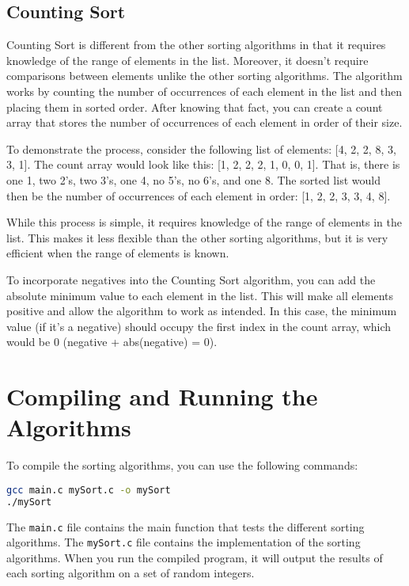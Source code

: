 \documentclass[12pt]{article}
\begin{document}
\subsection{Counting Sort}

Counting Sort is different from the other sorting algorithms in that it requires knowledge of the range of elements in the list.
Moreover, it doesn't require comparisons between elements unlike the other sorting algorithms.
The algorithm works by counting the number of occurrences of each element in the list and then placing them in sorted order.
After knowing that fact, you can create a count array that stores the number of occurrences of each element in order of their size.

To demonstrate the process, consider the following list of elements: [4, 2, 2, 8, 3, 3, 1].
The count array would look like this: [1, 2, 2, 2, 1, 0, 0, 1].
That is, there is one 1, two 2's, two 3's, one 4, no 5's, no 6's, and one 8.
The sorted list would then be the number of occurrences of each element in order: [1, 2, 2, 3, 3, 4, 8].

While this process is simple, it requires knowledge of the range of elements in the list.
This makes it less flexible than the other sorting algorithms, but it is very efficient when the range of elements is known.

To incorporate negatives into the Counting Sort algorithm, you can add the absolute minimum value to each element in the list.
This will make all elements positive and allow the algorithm to work as intended.
In this case, the minimum value (if it's a negative) should occupy the first index in the count array, which would be 0 (negative + abs(negative) = 0).

\section{Compiling and Running the Algorithms}

To compile the sorting algorithms, you can use the following commands:


\begin{lstlisting}[language=bash]
gcc main.c mySort.c -o mySort
./mySort
\end{lstlisting}

The \texttt{main.c} file contains the main function that tests the different sorting algorithms.
The \texttt{mySort.c} file contains the implementation of the sorting algorithms.
When you run the compiled program, it will output the results of each sorting algorithm on a set of random integers.
\end{document}
